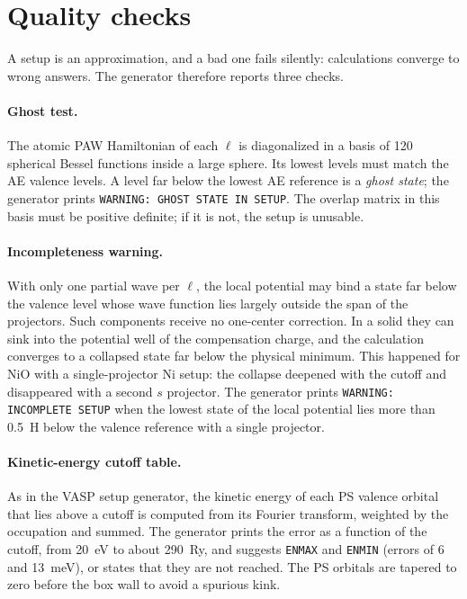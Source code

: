 \documentclass[11pt,a4paper,oneside]{book}
\begin{document}
\section{Quality checks}\label{sec:setupchecks}

A setup is an approximation, and a bad one fails silently: calculations
converge to wrong answers. The generator therefore reports three checks.

\paragraph{Ghost test.} The atomic PAW Hamiltonian of each $\ell$ is
diagonalized in a basis of 120 spherical Bessel functions inside a large
sphere. Its lowest levels must match the AE valence levels. A level far
below the lowest AE reference is a \emph{ghost state}; the generator
prints \texttt{WARNING: GHOST STATE IN SETUP}. The overlap matrix in this
basis must be positive definite; if it is not, the setup is unusable.

\paragraph{Incompleteness warning.} With only one partial wave per
$\ell$, the local potential may bind a state far below the valence level
whose wave function lies largely outside the span of the projectors.
Such components receive no one-center correction. In a solid they can
sink into the potential well of the compensation charge, and the
calculation converges to a collapsed state far below the physical
minimum. This happened for NiO with a single-projector Ni setup: the
collapse deepened with the cutoff and disappeared with a second $s$
projector. The generator prints \texttt{WARNING: INCOMPLETE SETUP} when
the lowest state of the local potential lies more than 0.5~H below the
valence reference with a single projector.

\paragraph{Kinetic-energy cutoff table.}\label{sec:kintable} As in the
VASP setup generator, the kinetic energy of each PS valence orbital that
lies above a cutoff is computed from its Fourier transform, weighted by
the occupation and summed. The generator prints the error as a function of
the cutoff, from 20~eV to about 290~Ry, and suggests \texttt{ENMAX} and
\texttt{ENMIN} (errors of 6 and 13~meV), or states that they are not
reached. The PS orbitals are tapered to zero before the box wall to avoid
a spurious kink.
\end{document}
